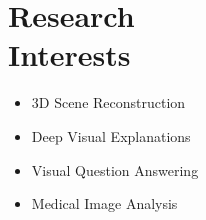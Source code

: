 \section{\sc Research \\ Interests}
\vspace{0.09cm}
	\begin{minipage}{0.55\linewidth}
		\begin{itemize}
			\item 3D Scene Reconstruction
			\item Deep Visual Explanations
		\end{itemize}

	\end{minipage}
	\begin{minipage}{0.55\linewidth}	
		\begin{itemize}
	\item Visual Question Answering
	\item Medical Image Analysis
\end{itemize}
	\end{minipage}

\endinput
